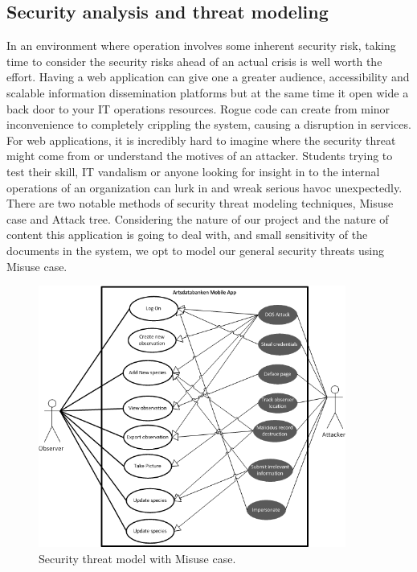 \subsection{Security analysis and threat modeling}
In an environment where operation involves some inherent security risk, taking time to consider the security risks ahead of an actual crisis is well worth the effort. Having a web application can give one a greater audience, accessibility and scalable information dissemination platforms but at the same time it open wide a back door to your IT operations resources. Rogue code can create from minor inconvenience to completely crippling the system, causing a disruption in services. For web applications, it is incredibly hard to imagine where the security threat might come from or understand the motives of an attacker. Students trying to test their skill, IT vandalism or anyone looking for insight in to the internal operations of an organization can lurk in and wreak serious havoc unexpectedly.
\\[0.5cm]
There are two notable methods of security threat modeling techniques, Misuse case and Attack tree. Considering the nature of our project and the nature of content this application is going to deal with, and small sensitivity of the documents in the system, we opt to model our general security threats using Misuse case.
\begin{figure}[htb]
	\centering
    \includegraphics[width=0.9\textwidth]{reqspec/misusecase.PNG}
	\caption{Security threat model with Misuse case.}
	\label{fig:misusecase}
\end{figure}

